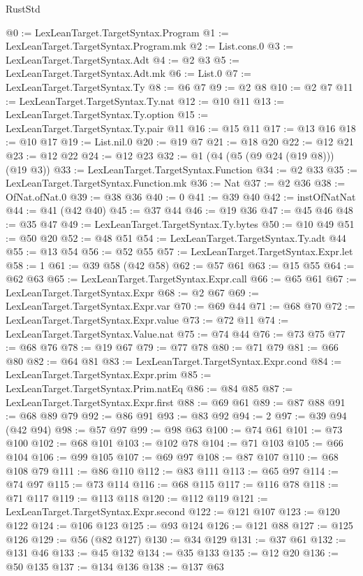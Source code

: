 \begin{lexlean}{RustStd}
\begin{coremodule}
@0 := LexLeanTarget.TargetSyntax.Program
@1 := LexLeanTarget.TargetSyntax.Program.mk
@2 := List.cons.{0}
@3 := LexLeanTarget.TargetSyntax.Adt
@4 := @2 @3
@5 := LexLeanTarget.TargetSyntax.Adt.mk
@6 := List.{0}
@7 := LexLeanTarget.TargetSyntax.Ty
@8 := @6 @7
@9 := @2 @8
@10 := @2 @7
@11 := LexLeanTarget.TargetSyntax.Ty.nat
@12 := @10 @11
@13 := LexLeanTarget.TargetSyntax.Ty.option
@15 := LexLeanTarget.TargetSyntax.Ty.pair @11
@16 := @15 @11
@17 := @13 @16
@18 := @10 @17
@19 := List.nil.{0}
@20 := @19 @7
@21 := @18 @20
@22 := @12 @21
@23 := @12 @22
@24 := @12 @23
@32 := @1 (@4 (@5 (@9 @24 (@19 @8))) (@19 @3))
@33 := LexLeanTarget.TargetSyntax.Function
@34 := @2 @33
@35 := LexLeanTarget.TargetSyntax.Function.mk
@36 := Nat
@37 := @2 @36
@38 := OfNat.ofNat.{0}
@39 := @38 @36
@40 := 0
@41 := @39 @40
@42 := instOfNatNat
@44 := @41 (@42 @40)
@45 := @37 @44
@46 := @19 @36
@47 := @45 @46
@48 := @35 @47
@49 := LexLeanTarget.TargetSyntax.Ty.bytes
@50 := @10 @49
@51 := @50 @20
@52 := @48 @51
@54 := LexLeanTarget.TargetSyntax.Ty.adt @44
@55 := @13 @54
@56 := @52 @55
@57 := LexLeanTarget.TargetSyntax.Expr.let
@58 := 1
@61 := @39 @58 (@42 @58)
@62 := @57 @61
@63 := @15 @55
@64 := @62 @63
@65 := LexLeanTarget.TargetSyntax.Expr.call
@66 := @65 @61
@67 := LexLeanTarget.TargetSyntax.Expr
@68 := @2 @67
@69 := LexLeanTarget.TargetSyntax.Expr.var
@70 := @69 @44
@71 := @68 @70
@72 := LexLeanTarget.TargetSyntax.Expr.value
@73 := @72 @11
@74 := LexLeanTarget.TargetSyntax.Value.nat
@75 := @74 @44
@76 := @73 @75
@77 := @68 @76
@78 := @19 @67
@79 := @77 @78
@80 := @71 @79
@81 := @66 @80
@82 := @64 @81
@83 := LexLeanTarget.TargetSyntax.Expr.cond
@84 := LexLeanTarget.TargetSyntax.Expr.prim
@85 := LexLeanTarget.TargetSyntax.Prim.natEq
@86 := @84 @85
@87 := LexLeanTarget.TargetSyntax.Expr.first
@88 := @69 @61
@89 := @87 @88
@91 := @68 @89 @79
@92 := @86 @91
@93 := @83 @92
@94 := 2
@97 := @39 @94 (@42 @94)
@98 := @57 @97
@99 := @98 @63
@100 := @74 @61
@101 := @73 @100
@102 := @68 @101
@103 := @102 @78
@104 := @71 @103
@105 := @66 @104
@106 := @99 @105
@107 := @69 @97
@108 := @87 @107
@110 := @68 @108 @79
@111 := @86 @110
@112 := @83 @111
@113 := @65 @97
@114 := @74 @97
@115 := @73 @114
@116 := @68 @115
@117 := @116 @78
@118 := @71 @117
@119 := @113 @118
@120 := @112 @119
@121 := LexLeanTarget.TargetSyntax.Expr.second
@122 := @121 @107
@123 := @120 @122
@124 := @106 @123
@125 := @93 @124
@126 := @121 @88
@127 := @125 @126
@129 := @56 (@82 @127)
@130 := @34 @129
@131 := @37 @61
@132 := @131 @46
@133 := @45 @132
@134 := @35 @133
@135 := @12 @20
@136 := @50 @135
@137 := @134 @136
@138 := @137 @63

\end{coremodule}
\end{lexlean}
